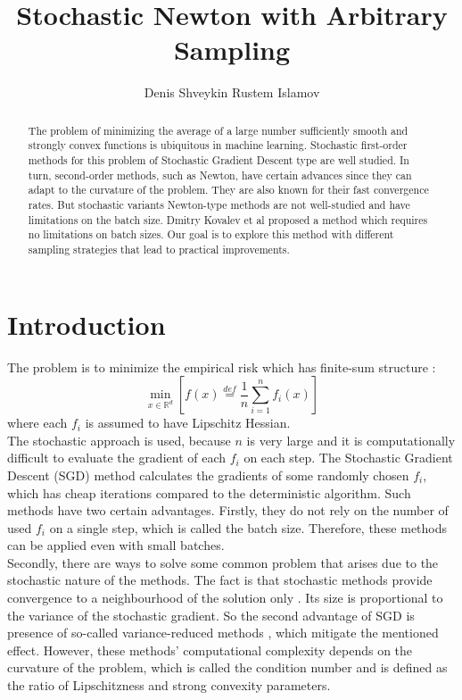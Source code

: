 \documentclass{article}
\title{Stochastic Newton with Arbitrary Sampling}
\author{Denis Shveykin
	\And
	Rustem Islamov
}
\date{}
\begin{document}
	
\maketitle

\begin{abstract}
	
	The problem of minimizing the average of a large number sufficiently smooth and strongly convex functions is ubiquitous in machine learning. Stochastic first-order methods for this problem of Stochastic Gradient Descent type are well studied. In turn, second-order methods, such as Newton, have certain advances since they can adapt to the curvature of the problem. They are also known for their fast convergence rates. But stochastic variants Newton-type methods are not well-studied and have limitations on the batch size. Dmitry Kovalev et al proposed a method which requires no limitations on batch sizes. Our goal is to explore this method with different sampling strategies that lead to practical improvements.
	
\end{abstract}


\keywords{}

\section{Introduction}

	The problem is to minimize the empirical risk which has finite-sum structure \cite{kovalev}:
	\begin{equation}
		\underset{x \in \mathbb R^d}{\min} \left[ f(x) \overset{def}{=} \frac{1}{n} \sum \limits_{i=1}^n f_i(x) \right]
	\end{equation}
	where each $f_i$ is assumed to have Lipschitz Hessian. \\
	
	The stochastic approach is used, because $n$ is very large and it is computationally difficult to evaluate the gradient of each $f_i$ on each step. The Stochastic Gradient Descent (SGD) method \cite{SGD-1} calculates the gradients of some randomly chosen $f_i$, which has cheap iterations compared to the deterministic algorithm. Such methods have two certain advantages. Firstly, they do not rely on the number of used $f_i$ on a single step, which is called the batch size. Therefore, these methods can be applied even with small batches. \\
	
	Secondly, there are ways to solve some common problem that arises due to the stochastic nature of the methods. The fact is that stochastic methods provide convergence to a neighbourhood of the solution only \cite{sgd-hogwild, sgd-general-analysis}. Its size is proportional to the variance of the stochastic gradient. So the second advantage of SGD is presence of so-called variance-reduced methods \cite{exp-convergence, advances-NIPS, unified-sgd, one-method}, which mitigate the mentioned effect. However, these methods' computational complexity depends on the curvature of the problem, which is called the condition number and is defined as the ratio of Lipschitzness and strong convexity parameters. \\
	
\end{document}
